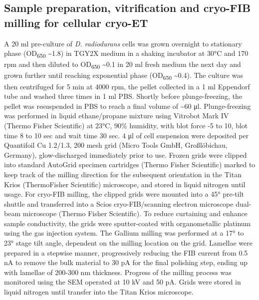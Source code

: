 \subsection{Sample preparation, vitrification and cryo-FIB milling for cellular cryo-ET}\label{drad_lamellae_method}
A 20 ml pre-culture of \textit{D. radiodurans} cells was grown overnight to stationary phase (OD\textsubscript{650} \sim1.8) in TGY2X medium in a shaking incubator at 30°C and 170 rpm and then diluted to OD\textsubscript{650} \sim0.1 in 20 ml fresh medium the next day and grown further until reaching exponential phase (OD\textsubscript{650} \sim0.4).
The culture was then centrifuged for 5 min at 4000 rpm, the pellet collected in a 1 ml Eppendorf tube and washed three times in 1 ml PBS.
Shortly before plunge-freezing, the pellet was resuspended in PBS to reach a final volume of \sim60 μl.
Plunge-freezing was performed in liquid ethane/propane mixture using Vitrobot Mark IV (Thermo Fisher Scientific) at 23°C, 90\% humidity, with blot force -5 to 10, blot time 8 to 10 sec and wait time 30 sec.
4 μl of cell suspension were deposited per Quantifoil Cu 1.2/1.3, 200 mesh grid (Micro Tools GmbH, Großlöbichau, Germany), glow-discharged immediately prior to use.
Frozen grids were clipped into standard AutoGrid specimen cartridges (Thermo Fisher Scientific) marked to keep track of the milling direction for the subsequent orientation in the Titan Krios (ThermoFisher Scientific) microscope, and stored in liquid nitrogen until usage.
For cryo-FIB milling, the clipped grids were mounted into a 45° pre-tilt shuttle and transferred into a Scios cryo-FIB/scanning electron microscope dual-beam microscope (Thermo Fisher Scientific).
To reduce curtaining and enhance sample conductivity, the grids were sputter-coated with organometallic platinum using the gas injection system.
The Gallium milling was performed at a 17° to 23° stage tilt angle, dependent on the milling location on the grid.
Lamellae were prepared in a stepwise manner, progressively reducing the FIB current from 0.5 nA to remove the bulk material to 30 pA for the final polishing step, ending up with lamellae of 200-300 nm thickness.
Progress of the milling process was monitored using the SEM operated at 10 kV and 50 pA.
Grids were stored in liquid nitrogen until transfer into the Titan Krios microscope.

